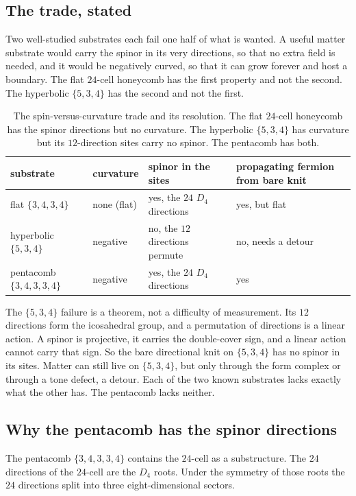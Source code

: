 \subsection{The trade, stated}

Two well-studied substrates each fail one half of what is wanted. A useful matter
substrate would carry the spinor in its very directions, so that no extra field is
needed, and it would be negatively curved, so that it can grow forever and host a
boundary. The flat $24$-cell honeycomb has the first property and not the second.
The hyperbolic $\{5,3,4\}$ has the second and not the first.

\begin{table}[ht]
\centering
\begin{tabular}{@{}llll@{}}
\toprule
substrate & curvature & spinor in the sites & propagating fermion from bare knit \\
\midrule
flat $\{3,4,3,4\}$ & none (flat) & yes, the $24$ $D_4$ directions & yes, but flat \\
hyperbolic $\{5,3,4\}$ & negative & no, the $12$ directions permute & no, needs a detour \\
pentacomb $\{3,4,3,3,4\}$ & negative & yes, the $24$ $D_4$ directions & yes \\
\bottomrule
\end{tabular}
\caption{The spin-versus-curvature trade and its resolution. The flat $24$-cell
honeycomb has the spinor directions but no curvature. The hyperbolic $\{5,3,4\}$ has
curvature but its $12$-direction sites carry no spinor. The pentacomb has both.}
\label{tab:pentacomb-trade}
\end{table}

The $\{5,3,4\}$ failure is a theorem, not a difficulty of measurement. Its $12$
directions form the icosahedral group, and a permutation of directions is a linear
action. A spinor is projective, it carries the double-cover sign, and a linear action
cannot carry that sign. So the bare directional knit on $\{5,3,4\}$ has no spinor in
its sites. Matter can still live on $\{5,3,4\}$, but only through the form complex or
through a tone defect, a detour. Each of the two known substrates lacks exactly what
the other has. The pentacomb lacks neither.

\subsection{Why the pentacomb has the spinor directions}

The pentacomb $\{3,4,3,3,4\}$ contains the $24$-cell as a substructure. The $24$
directions of the $24$-cell are the $D_4$ roots. Under the symmetry of those roots
the $24$ directions split into three eight-dimensional sectors.


